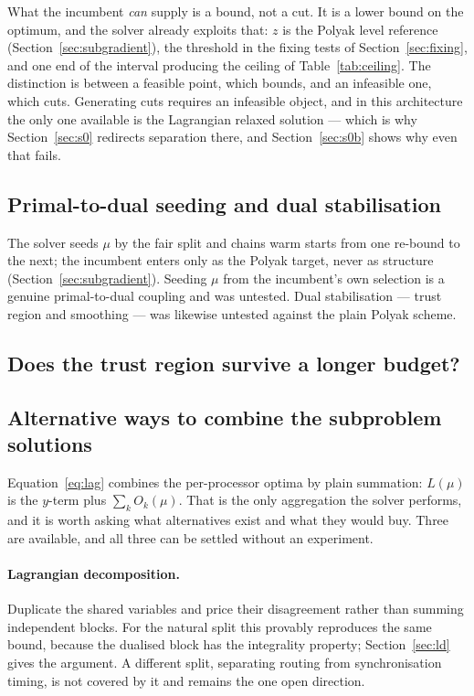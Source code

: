 \documentclass[11pt,a4paper]{article}
\begin{document}
What the incumbent \emph{can} supply is a bound, not a cut. It is a lower bound on
the optimum, and the solver already exploits that: $z$ is the Polyak level
reference (Section~\ref{sec:subgradient}), the threshold in the fixing tests of
Section~\ref{sec:fixing}, and one end of the interval producing the ceiling of
Table~\ref{tab:ceiling}. The distinction is between a feasible point, which
bounds, and an infeasible one, which cuts. Generating cuts requires an infeasible
object, and in this architecture the only one available is the Lagrangian relaxed
solution --- which is why Section~\ref{sec:s0} redirects separation there, and
Section~\ref{sec:s0b} shows why even that fails.

\subsection{Primal-to-dual seeding and dual stabilisation}\label{sec:seeding}

The solver seeds $\mu$ by the fair split and chains warm starts from one re-bound
to the next; the incumbent enters only as the Polyak target, never as structure
(Section~\ref{sec:subgradient}). Seeding $\mu$ from the incumbent's own selection
is a genuine primal-to-dual coupling and was untested. Dual stabilisation --- trust
region and smoothing --- was likewise untested against the plain Polyak scheme.



\subsection{Does the trust region survive a longer budget?}\label{sec:convergence}



\subsection{Alternative ways to combine the subproblem solutions}\label{sec:combining}

Equation~\eqref{eq:lag} combines the per-processor optima by plain summation:
$L(\mu)$ is the $y$-term plus $\sum_k O_k(\mu)$. That is the only aggregation the
solver performs, and it is worth asking what alternatives exist and what they
would buy. Three are available, and all three can be settled without an
experiment.

\paragraph{Lagrangian decomposition.} Duplicate the shared variables and price
their disagreement rather than summing independent blocks. For the natural split
this provably reproduces the same bound, because the dualised block has the
integrality property; Section~\ref{sec:ld} gives the argument. A different split,
separating routing from synchronisation timing, is not covered by it and remains
the one open direction.
\end{document}
